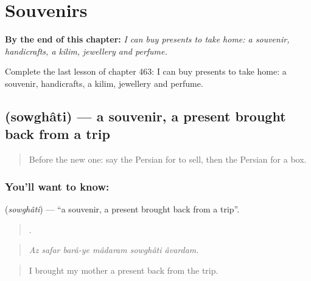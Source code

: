 
\chapter{Souvenirs}
\label{ch:fa-souvenirs}

\begin{chapteropening}
\textbf{By the end of this chapter:} \emph{I can buy presents to take home: a souvenir, handicrafts, a kilim, jewellery and perfume.}

Complete the last lesson of chapter 463: I can buy presents to take home: a souvenir, handicrafts, a kilim, jewellery and perfume.
\end{chapteropening}

\section[\texorpdfstring{\fa{سوغاتی} (sowghâti)}{سوغاتی (sowghâti)}]{ (sowghâti) — a souvenir, a present brought back from a trip}

\label{lesson:FA-C463-sowghati}



\begin{quote}
Before the new one: say the Persian for to sell, then the Persian for a box.
\end{quote}

\subsection*{You'll want to know: }
\textbf{} (\emph{sowghâti}) — \textquotedblleft{}a souvenir, a present brought back from a trip\textquotedblright{}.

\begin{quote}
     .
\end{quote}

\begin{quote}
\emph{Az safar barâ-ye mâdaram sowghâti âvardam.}
\end{quote}

\begin{quote}
I brought my mother a present back from the trip.
\end{quote}

